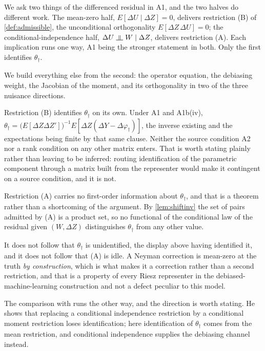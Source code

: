 \documentclass[
  12pt]{article}
\newcommand{\1}[1]{\mathds{1}\left[#1\right]}
\theoremstyle{plain}
\theoremstyle{definition}
\theoremstyle{definition}
\theoremstyle{remark}
\newcommand{\upmodels}{\mathrel{\rotatebox[origin=c]{90}{$\models$}}}
\newcommand{\vdagger}{\varphi_{\dagger}}
\begin{document}
We ask two things of the differenced residual in A1, and the two halves
do different work. The mean-zero half, \(E[\Delta U\mid\Delta Z]=0\),
delivers restriction (B) of \cref{def:admissible}, the unconditional
orthogonality \(E[\Delta Z\,\Delta U]=0\); the conditional-independence
half, \(\Delta U\upmodels W\mid\Delta Z\), delivers restriction (A).
Each implication runs one way, A1 being the stronger statement in both.
Only the first identifies \(\theta_\dagger\).

We build everything else from the second: the operator equation, the
debiasing weight, the Jacobian of the moment, and its orthogonality in
two of the three nuisance directions.

Restriction (B) identifies \(\theta_\dagger\) on its own. Under A1 and
A1b(iv),
\(\theta_\dagger=\big(E[\Delta Z\Delta Z']\big)^{-1}E[\Delta Z(\Delta Y-\Delta\vdagger)]\),
the inverse existing and the expectations being finite by that same
clause. Neither the source condition A2 nor a rank condition on any
other matrix enters. That is worth stating plainly rather than leaving
to be inferred: routing identification of the parametric component
through a matrix built from the representer would make it contingent on
a source condition, and it is not.

Restriction (A) carries no first-order information about
\(\theta_\dagger\), and that is a theorem rather than a shortcoming of
the argument. By \cref{lem:shiftinv} the set of pairs admitted by (A) is
a product set, so no functional of the conditional law of the residual
given \((W,\Delta Z)\) distinguishes \(\theta_\dagger\) from any other
value.

It does not follow that \(\theta_\dagger\) is unidentified, the display
above having identified it, and it does not follow that (A) is idle. A
Neyman correction is mean-zero at the truth \emph{by construction},
which is what makes it a correction rather than a second restriction,
and that is a property of every Riesz representer in the
debiased-machine-learning construction
\citep{chernozhukov2018dml,chernozhukov2022adml,chernozhukov2022riesz}
and not a defect peculiar to this model.

The comparison with \citet{poirier2017} runs the other way, and the
direction is worth stating. He shows that replacing a conditional
independence restriction by a conditional moment restriction loses
identification; here identification of \(\theta_\dagger\) comes from the
mean restriction, and conditional independence supplies the debiasing
channel instead.
\end{document}
